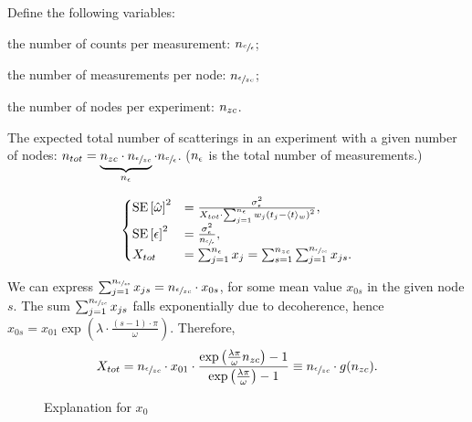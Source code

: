 \documentclass{article}
\begin{document}
Define the following variables: \begin{inparaenum}
	\item the number of counts per measurement: $n_{\sfrac{c}{\epsilon}}$;
	\item the number of measurements per node: $n_{\sfrac{\epsilon}{zc}}$;
	\item the number of nodes per experiment: $n_{zc}$.
\end{inparaenum}

The expected total number of scatterings in an experiment with a given number of nodes: $n_{tot} = \underbrace{n_{zc}\cdot n_{\sfrac{\epsilon}{zc}}}_{n_{\epsilon}}\cdot n_{\sfrac{c}{\epsilon}}$. ($n_{\epsilon}$ is the total number of measurements.)

\begin{equation}
\begin{cases}
	\SE{\hat{\omega}}^2 &= \frac{\SD{\meas}^2}{X_{tot}\cdot\sum_{j=1}^{\Nm}w_j\bkt{t_j - \avg{t}_w}^2}, \\
	\SE{\meas}^2 &= \frac{\SD{\meas}^2}{\Ncm} ,\\
	X_{tot} &= \sum_{j=1}^{\Nm} x_j = \sum_{s=1}^{\Nnd}\sum_{j=1}^{\Nmnd} x_{js}.
\end{cases}
\end{equation}

We can express $\sum_{j=1}^{n_{\sfrac{\epsilon}{zc}}} x_{js} = n_{\sfrac{\epsilon}{zc}} \cdot x_{0s}$, for some mean value $x_{0s}$ in the given node $s$. The sum $\sum_{j=1}^{n_{\sfrac{\epsilon}{zc}}} x_{js}$ falls exponentially due to decoherence, hence $x_{0s} = x_{01}\exp{(\lambda\cdot \frac{(s-1)\cdot\pi}{\omega})}$. Therefore,
\[
	X_{tot} = \Nmnd\cdot x_{01} \cdot \frac{\exp{\bkt{\frac{\lambda\pi}{\omega}\Nnd}}-1}{\exp{\bkt{\frac{\lambda\pi}{\omega}}}-1} \equiv \Nmnd \cdot g(\Nnd).
\]

\begin{figure}[h]
	\centering
	\caption{Explanation for $x_0$\label{fig:x0Expl}}
\end{figure}
\end{document}
